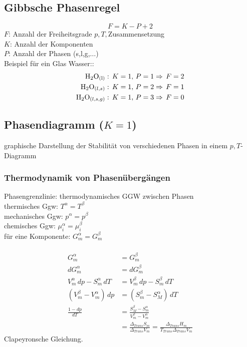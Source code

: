 \documentclass[a4paper, fleqn]{article}
\begin{document}
\subsection{Gibbsche Phasenregel}
\begin{equation*}
    F = K-P+2
\end{equation*}
$F$: Anzahl der Freiheitsgrade $p,T,$Zusammensetzung\\
$K$: Anzahl der Komponenten\\
$P$: Anzahl der Phasen (s,l,g,$\dots$)\\
Beispiel für ein Glas Wasser::
\begin{align*}
    \ce{H2O_{(l)}}&:\,K = 1,\,P=1\Rightarrow\,F=2\\
    \ce{H2O_{(l,s)}}&:\,K=1,\,P=2\Rightarrow\,F=1\\
    \ce{H2O_{(l,s,g)}}&:\,K=1,\,P=3\Rightarrow\,F=0\\
\end{align*}

\subsection{Phasendiagramm ($K=1$)}
graphische Darstellung der Stabilität von verschiedenen Phasen in einem $p,T$-Diagramm 

\subsubsection{Thermodynamik von Phasenübergängen}
Phasengrenzlinie: thermodynamisches GGW zwischen Phasen\\
thermisches Ggw: $T^\alpha = T^\beta$\\
mechanisches Ggw: $p^\alpha = p^\beta$\\
chemisches Ggw: $\mu_i^\alpha = \mu_i^\beta$\\
für eine Komponente: $G_m^\alpha = G_m^\beta$\\\\
\begin{align*}
    G_m^\alpha &= G_m^\beta\\
    dG_m^\alpha &= dG_m^\beta\\
    V_m^\alpha \,dp -S_m^\alpha\,dT &= V_m^\beta\,dp-S_m^\beta\,dT\\
    (V_m^\beta - V_m ^\alpha) \,dp &= (S_m^\beta - S_M^\alpha)\,dT\\
    \frac{1-dp}{dT} &= \frac{S_M^\beta - S_m^\alpha}{V_m^\beta - V_m^\alpha}\\ &= \frac{\Delta_{Trans}S_m}{\Delta_{Trans}V_m}=\frac{\Delta_{Trans} H_m}{T_{Trans} \Delta_{Trans} V_m}
\end{align*}
Clapeyronsche Gleichung.
\end{document}
